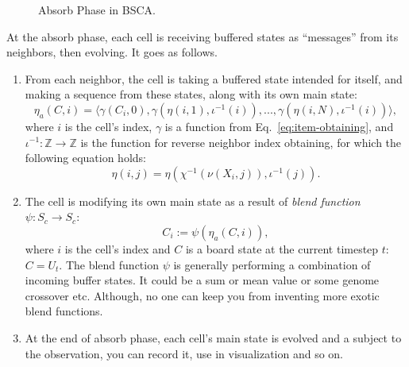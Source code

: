 \documentclass[a4paper,12pt,tikz,UTF8]{article}
\begin{document}
\begin{figure}[H]
      \caption{Absorb Phase in BSCA.}
      \label{fig:absorb-phase}
    \end{figure}

    At the absorb phase, each cell is receiving buffered states as ``messages'' from its neighbors, then evolving. It goes as follows.
    \begin{enumerate}
      \item 
        From each neighbor, the cell is taking a buffered state intended for itself, and making a sequence from these states, along with its own main state:
        \begin{equation}
          \label{eq:neighbors-main-sequence}
          \eta_a(C, i) = \langle \gamma({C_i}, 0), \gamma(\eta(i, 1), \iota^{-1}(i)), ..., \gamma(\eta(i, N), \iota^{-1}(i)) \rangle,
        \end{equation}
        where $i$ is the cell's index, $\gamma$ is a function from Eq.~\ref{eq:item-obtaining}, and $\iota^{-1}: \mathbb{Z} \to \mathbb{Z}$ is the function for reverse neighbor index obtaining, for which the following equation holds:
        \begin{equation}
          \eta(i, j) = \eta(\chi^{-1}(\nu(X_i, j)), \iota^{-1}(j)).
        \end{equation}
      \item
        The cell is modifying its own main state as a result of \textit{blend function} $\psi: S_c \to S_c$:
        \begin{equation}
          \label{eq:blend-function}
          C_i := \psi(\eta_a(C, i)),
        \end{equation}
        where $i$ is the cell's index and $C$ is a board state at the current timestep $t$: $C = U_t$. The blend function $\psi$ is generally performing a combination of incoming buffer states. It could be a sum or mean value or some genome crossover etc. Although, no one can keep you from inventing more exotic blend functions.
      \item
        At the end of absorb phase, each cell's main state is evolved and a subject to the observation, you can record it, use in visualization and so on.
    \end{enumerate}
\end{document}
